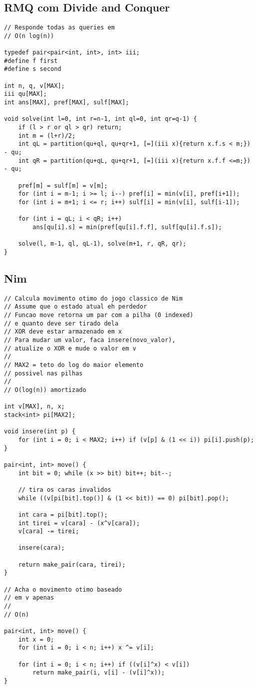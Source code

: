 \documentclass[12pt, a4paper, twoside]{article}
\begin{document}
\subsection{RMQ com Divide and Conquer}
\begin{lstlisting}
// Responde todas as queries em
// O(n log(n))

typedef pair<pair<int, int>, int> iii;
#define f first
#define s second

int n, q, v[MAX];
iii qu[MAX];
int ans[MAX], pref[MAX], sulf[MAX];

void solve(int l=0, int r=n-1, int ql=0, int qr=q-1) {
	if (l > r or ql > qr) return;
	int m = (l+r)/2;
	int qL = partition(qu+ql, qu+qr+1, [=](iii x){return x.f.s < m;}) - qu;
	int qR = partition(qu+qL, qu+qr+1, [=](iii x){return x.f.f <=m;}) - qu;

	pref[m] = sulf[m] = v[m];
	for (int i = m-1; i >= l; i--) pref[i] = min(v[i], pref[i+1]);
	for (int i = m+1; i <= r; i++) sulf[i] = min(v[i], sulf[i-1]);

	for (int i = qL; i < qR; i++)
		ans[qu[i].s] = min(pref[qu[i].f.f], sulf[qu[i].f.s]);

	solve(l, m-1, ql, qL-1), solve(m+1, r, qR, qr);
}
\end{lstlisting}

\subsection{Nim}
\begin{lstlisting}
// Calcula movimento otimo do jogo classico de Nim
// Assume que o estado atual eh perdedor
// Funcao move retorna um par com a pilha (0 indexed)
// e quanto deve ser tirado dela
// XOR deve estar armazenado em x
// Para mudar um valor, faca insere(novo_valor),
// atualize o XOR e mude o valor em v
//
// MAX2 = teto do log do maior elemento
// possivel nas pilhas
//
// O(log(n)) amortizado
 
int v[MAX], n, x;
stack<int> pi[MAX2];
 
void insere(int p) {
    for (int i = 0; i < MAX2; i++) if (v[p] & (1 << i)) pi[i].push(p);
}
 
pair<int, int> move() {
    int bit = 0; while (x >> bit) bit++; bit--;
   
    // tira os caras invalidos
    while ((v[pi[bit].top()] & (1 << bit)) == 0) pi[bit].pop();
 
    int cara = pi[bit].top();
    int tirei = v[cara] - (x^v[cara]);
    v[cara] -= tirei;
 
    insere(cara);
 
    return make_pair(cara, tirei);
}

// Acha o movimento otimo baseado
// em v apenas
//
// O(n)

pair<int, int> move() {
	int x = 0;
	for (int i = 0; i < n; i++) x ^= v[i];

	for (int i = 0; i < n; i++) if ((v[i]^x) < v[i])
		return make_pair(i, v[i] - (v[i]^x));
}
\end{lstlisting}
\end{document}
